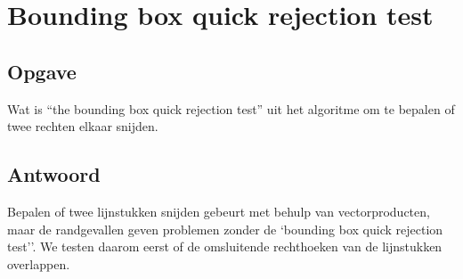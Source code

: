 \documentclass[examenvragen.tex]{subfiles}
\begin{document}
\section{Bounding box quick rejection test}
\subsection{Opgave}
Wat is ``the bounding box quick rejection test'' uit het algoritme om te bepalen of twee rechten elkaar snijden. 

\subsection{Antwoord}
Bepalen of twee lijnstukken snijden gebeurt met behulp van vectorproducten, maar de randgevallen geven problemen zonder de `bounding box quick rejection test''. We testen daarom eerst of de omsluitende rechthoeken van de lijnstukken overlappen. 
\end{document}
